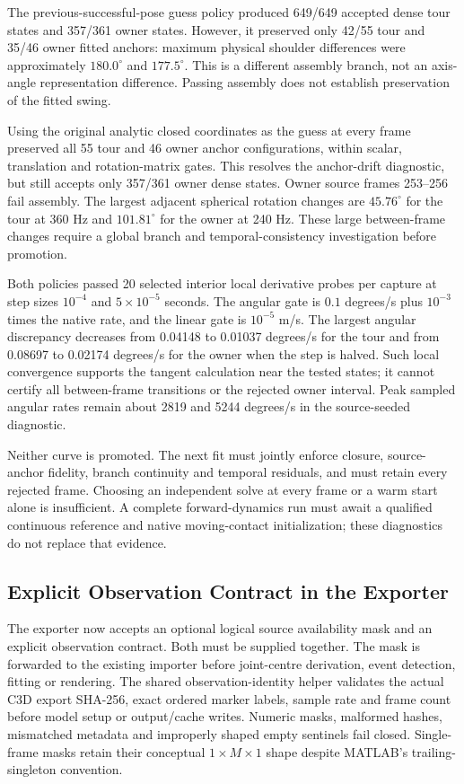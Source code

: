 \documentclass[11pt,a4paper]{article}
\begin{document}
The previous-successful-pose guess policy produced 649/649 accepted dense
tour states and 357/361 owner states. However, it preserved only 42/55 tour
and 35/46 owner fitted anchors: maximum physical shoulder differences were
approximately $180.0^\circ$ and $177.5^\circ$. This is a different assembly
branch, not an axis-angle representation difference. Passing assembly
does not establish preservation of the fitted swing.

Using the original analytic closed coordinates as the guess at every frame
preserved all 55 tour and 46 owner anchor configurations, within scalar,
translation and rotation-matrix gates. This resolves the anchor-drift
diagnostic, but still accepts only 357/361 owner dense states. Owner source
frames 253--256 fail assembly. The largest adjacent spherical rotation
changes are $45.76^\circ$ for the tour at 360 Hz and $101.81^\circ$ for the
owner at 240 Hz. These large between-frame changes require a global branch
and temporal-consistency investigation before promotion.

Both policies passed 20 selected interior local derivative probes per
capture at step sizes $10^{-4}$ and $5\times10^{-5}$ seconds. The angular
gate is $0.1$ degrees/s plus $10^{-3}$ times the native rate, and the linear
gate is $10^{-5}$ m/s. The largest angular discrepancy decreases from
0.04148 to 0.01037 degrees/s for the tour and from 0.08697 to 0.02174
degrees/s for the owner when the step is halved. Such local convergence
supports the tangent calculation near the tested states; it cannot certify
all between-frame transitions or the rejected owner interval. Peak sampled
angular rates remain about 2819 and 5244 degrees/s in the source-seeded
diagnostic.

Neither curve is promoted. The next fit must jointly enforce closure,
source-anchor fidelity, branch continuity and temporal residuals, and must
retain every rejected frame. Choosing an independent solve at every frame
or a warm start alone is insufficient. A complete forward-dynamics run
must await a qualified continuous reference and native moving-contact
initialization; these diagnostics do not replace that evidence.


\subsection{Explicit Observation Contract in the Exporter}
\label{sec:observation-export-contract}
The exporter now accepts an optional logical source availability mask and
an explicit observation contract. Both must be supplied together. The mask
is forwarded to the existing importer before joint-centre derivation,
event detection, fitting or rendering. The shared observation-identity
helper validates the actual C3D export SHA-256, exact ordered marker labels,
sample rate and frame count before model setup or output/cache writes.
Numeric masks, malformed hashes, mismatched metadata and improperly shaped
empty sentinels fail closed. Single-frame masks retain their conceptual
$1\times M\times1$ shape despite MATLAB's trailing-singleton convention.
\end{document}
